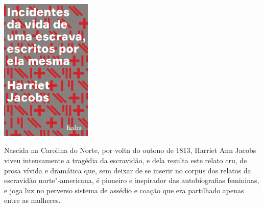 \pagebreak

\hspace{.5cm}

\begin{center}
\hspace*{-.5cm}\includegraphics[width=43.4mm]{./imgs/jacobs.jpg}
\end{center}

\hspace*{-7cm}\hrulefill\hspace*{-7cm}

\medskip

\noindent{}Nascida na Carolina do Norte, por volta do outono de 1813, Harriet Ann Jacobs viveu intensamente a tragédia da escravidão, e dela resulta este relato cru, de prosa vívida e dramática que, sem deixar de se inserir no corpus dos relatos da escravidão norte"-americana, é pioneiro e inspirador das autobiografias femininas, e joga luz no perverso sistema de assédio e coação que era partilhado apenas entre as mulheres.

\vfill

\hspace*{-.4cm}\begin{minipage}[c]{1\linewidth}
\small{
{}}
\end{minipage}


\pagebreak

